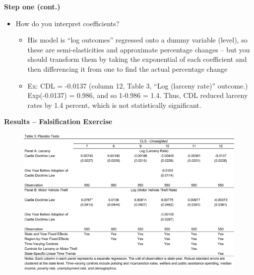 \documentclass[notes=show]{beamer}
\begin{document}
\begin{frame}[plain]
\begin{center}
\textbf{Step one (cont.)}
\end{center}

\begin{itemize}
	\item How do you interpret coefficients?
		\begin{itemize} 
		\item His model is ``log outcomes'' regressed onto a dummy variable (level), so these are semi-elasticities and approximate percentage changes -- but you should transform them by taking the exponential of each coefficient and then differencing it from one to find the actual percentage change
		\item Ex: CDL = -0.0137 (column 12, Table 3, ``Log (larceny rate)'' outcome.)  Exp(-0.0137) = 0.986, and so 1-0.986 = 1.4.  Thus, CDL reduced larceny rates by 1.4 percent, which is not statistically significant.  
		\end{itemize}
\end{itemize}

\end{frame}

\begin{frame}[plain]
	\begin{center}
	\textbf{Results -- Falsification Exercise}
	\end{center}
	
	\begin{figure}
	\includegraphics[scale=0.4]{./lecture_includes/cheng3.pdf}
	\end{figure}
\end{frame}
\end{document}

